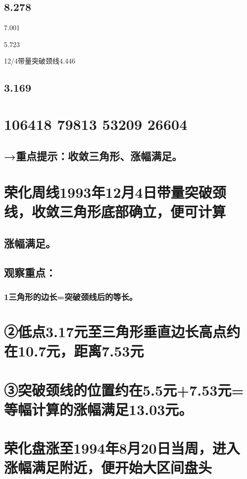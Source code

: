 \documentclass{article}
\begin{document}
\subsection{8.278}

7.001

5.723

12/4带量突破颈线4.446

\subsection{3.169}

\section{106418 79813 53209 26604}

\subsection{→重点提示：收敛三角形、涨幅满足。}

\section{荣化周线1993年12月4日带量突破颈线，收敛三角形底部确立，便可计算}

\subsection{涨幅满足。}

\subsection{观察重点：}

\subsubsection{1三角形的边长=突破颈线后的等长。}

\section{②低点3.17元至三角形垂直边长高点约在10.7元，距离7.53元}

\section{③突破颈线的位置约在5.5元+7.53元=等幅计算的涨幅满足13.03元。}

\section{荣化盘涨至1994年8月20日当周，进入涨幅满足附近，便开始大区间盘头}
\end{document}
